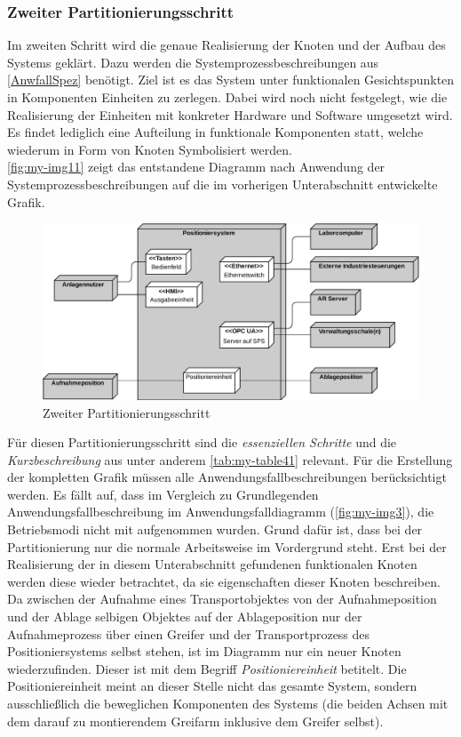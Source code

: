 \documentclass[../Bachelorarbeit.tex]{subfiles}
\begin{document}
\subsubsection{Zweiter Partitionierungsschritt}
Im zweiten Schritt wird die genaue Realisierung der Knoten und der Aufbau des Systems geklärt. Dazu werden die Systemprozessbeschreibungen aus \autoref{AnwfallSpez} benötigt. Ziel ist es das System unter funktionalen Gesichtspunkten in Komponenten \bzw Einheiten zu zerlegen. Dabei wird noch nicht festgelegt, wie die Realisierung der Einheiten mit konkreter Hardware und Software umgesetzt wird. Es findet lediglich eine Aufteilung in funktionale Komponenten statt, welche wiederum in Form von Knoten Symbolisiert werden. \\
\autoref{fig:my-img11} zeigt das entstandene Diagramm nach Anwendung der Systemprozessbeschreibungen auf die im vorherigen Unterabschnitt entwickelte Grafik. 

\begin{figure}[H]
    \centering
    \includegraphics[width=\textwidth]{Images/zweiter_schritt.pdf}
    \caption[Zweiter Partitionierungsschritt]{Zweiter Partitionierungsschritt}
    \label{fig:my-img11}
\end{figure}

Für diesen Partitionierungsschritt sind die \textit{essenziellen Schritte} und die \textit{Kurzbeschreibung} aus unter anderem \autoref{tab:my-table41} relevant. Für die Erstellung der kompletten Grafik müssen alle Anwendungsfallbeschreibungen berücksichtigt werden. Es fällt auf, dass im Vergleich zu Grundlegenden Anwendungsfallbeschreibung im Anwendungsfalldiagramm (\autoref{fig:my-img3}), die Betriebsmodi nicht mit aufgenommen wurden. Grund dafür ist, dass bei der Partitionierung nur die normale Arbeitsweise im Vordergrund steht. Erst bei der Realisierung der in diesem Unterabschnitt gefundenen funktionalen Knoten werden diese wieder betrachtet, da sie eigenschaften dieser Knoten beschreiben.\\
Da zwischen der Aufnahme eines Transportobjektes von der Aufnahmeposition und der Ablage selbigen Objektes auf der Ablageposition nur der Aufnahmeprozess über einen Greifer und der Transportprozess des Positioniersystems selbst stehen, ist im Diagramm nur ein neuer Knoten wiederzufinden. Dieser ist mit dem Begriff \textit{Positioniereinheit} betitelt. Die Positioniereinheit meint an dieser Stelle nicht das gesamte System, sondern ausschließlich die beweglichen Komponenten des Systems (die beiden Achsen mit dem darauf zu montierendem Greifarm inklusive dem Greifer selbst).
\end{document}
